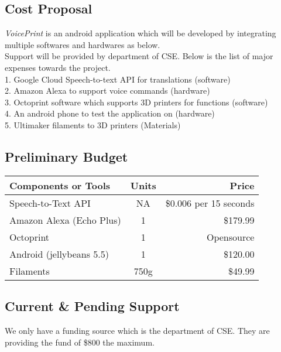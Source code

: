 \subsection{Cost Proposal}
\textit{VoicePrint} is an android application which will be developed by integrating multiple softwares and hardwares as below.
\\
Support will be provided by department of CSE. Below is the list of major expenses towards the project.
\\
1. Google Cloud Speech-to-text API for translations (software)
\\
2. Amazon Alexa to support voice commands (hardware)
\\
3. Octoprint software which supports 3D printers for functions (software)
\\
4. An android phone to test the application on (hardware)
\\
5. Ultimaker filaments to 3D printers (Materials)

\subsection{Preliminary Budget}
\begin{tabular}{|l|c|r|}
	\hline
    Components or Tools & Units & Price\\
    \hline
    \hline
	Speech-to-Text API & NA & \$0.006 per 15 seconds\\
	\hline
	Amazon Alexa (Echo Plus) & 1 & \$179.99\\
	\hline
	Octoprint & 1 & Opensource\\
	\hline
	Android (jellybeans 5.5) & 1 & \$120.00\\
	\hline
	Filaments & 750g & \$49.99\\
	\hline
\end{tabular}

\subsection{Current \& Pending Support}
We only have a funding source which is the department of CSE. They are providing the fund of \$800 the maximum. \\